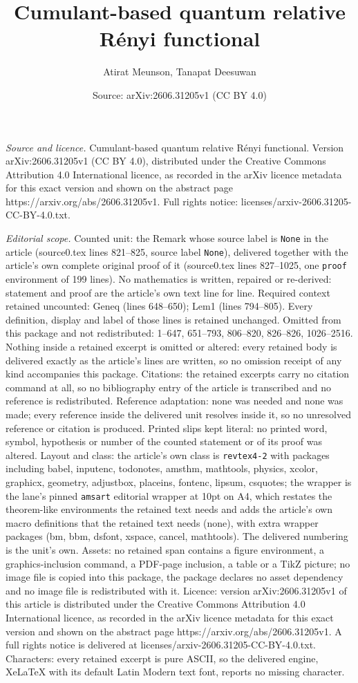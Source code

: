 \documentclass[10pt,a4paper]{amsart}
\title[Cumulant-based quantum relative R\'enyi functional]{Cumulant-based quantum relative R\'enyi functional}
\author{Atirat Meunson, Tanapat Deesuwan}
\date{Source: arXiv:2606.31205v1 (CC BY 4.0)}
\begin{document}
\maketitle

\noindent\emph{Source and licence.} Cumulant-based quantum relative R\'enyi functional. Version arXiv:2606.31205v1 (CC BY 4.0), distributed under the Creative Commons Attribution 4.0 International licence, as recorded in the arXiv licence metadata for this exact version and shown on the abstract page https://arxiv.org/abs/2606.31205v1. Full rights notice: licenses/arxiv-2606.31205-CC-BY-4.0.txt.\par\smallskip

\noindent\textit{Editorial scope.} Counted unit: the Remark whose source label is \texttt{None} in the article (source0.tex lines 821--825, source label \texttt{None}), delivered together with the article's own complete original proof of it (source0.tex lines 827--1025, one \texttt{proof} environment of 199 lines). No mathematics is written, repaired or re-derived: statement and proof are the article's own text line for line. Required context retained uncounted: Geneq (lines 648--650); Lem1 (lines 794--805). Every definition, display and label of those lines is retained unchanged. Omitted from this package and not redistributed: 1--647, 651--793, 806--820, 826--826, 1026--2516. Nothing inside a retained excerpt is omitted or altered: every retained body is delivered exactly as the article's lines are written, so no omission receipt of any kind accompanies this package. Citations: the retained excerpts carry no citation command at all, so no bibliography entry of the article is transcribed and no reference is redistributed. Reference adaptation: none was needed and none was made; every reference inside the delivered unit resolves inside it, so no unresolved reference or citation is produced. Printed slips kept literal: no printed word, symbol, hypothesis or number of the counted statement or of its proof was altered. Layout and class: the article's own class is \texttt{revtex4-2} with packages including babel, inputenc, todonotes, amsthm, mathtools, physics, xcolor, graphicx, geometry, adjustbox, placeins, fontenc, lipsum, csquotes; the wrapper is the lane's pinned \texttt{amsart} editorial wrapper at 10pt on A4, which restates the theorem-like environments the retained text needs and adds the article's own macro definitions that the retained text needs (none), with extra wrapper packages (bm, bbm, dsfont, xspace, cancel, mathtools). The delivered numbering is the unit's own. Assets: no retained span contains a figure environment, a graphics-inclusion command, a PDF-page inclusion, a table or a TikZ picture; no image file is copied into this package, the package declares no asset dependency and no image file is redistributed with it. Licence: version arXiv:2606.31205v1 of this article is distributed under the Creative Commons Attribution 4.0 International licence, as recorded in the arXiv licence metadata for this exact version and shown on the abstract page https://arxiv.org/abs/2606.31205v1. A full rights notice is delivered at licenses/arxiv-2606.31205-CC-BY-4.0.txt. Characters: every retained excerpt is pure ASCII, so the delivered engine, XeLaTeX with its default Latin Modern text font, reports no missing character.
\end{document}
